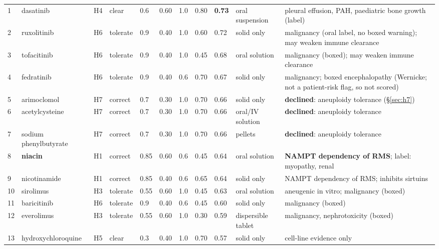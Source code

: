 \documentclass[10pt]{article}
\begin{document}
\begin{table}[H]\sffamily\scriptsize
\begin{tabularx}{\linewidth}{@{}P{0.45cm}P{2.1cm}P{0.6cm}P{1.0cm}P{0.55cm}P{0.6cm}P{0.55cm}P{0.55cm}P{0.7cm}P{1.75cm}L@{}}
\toprule\thead{\#} &  &  &  &  &  &  &  &  &  & \\ & dasatinib & H4 & clear & 0.6 & 0.60 & 1.0 & 0.80 & \textbf{0.73} & oral suspension & pleural effusion, PAH, paediatric bone growth (label)\\
2 & ruxolitinib & H6 & tolerate & 0.9 & 0.40 & 1.0 & 0.60 & 0.72 & solid only & malignancy (oral label, no boxed warning); may weaken immune clearance\\
3 & tofacitinib & H6 & tolerate & 0.9 & 0.40 & 1.0 & 0.45 & 0.68 & oral solution & malignancy (boxed); may weaken immune clearance\\
4 & fedratinib & H6 & tolerate & 0.9 & 0.40 & 0.6 & 0.70 & 0.67 & solid only & malignancy; boxed encephalopathy (Wernicke; not a patient-risk flag, so not scored)\\
5 & arimoclomol & H7 & correct & 0.7 & 0.30 & 1.0 & 0.70 & 0.66 & solid only & \textbf{declined}: aneuploidy tolerance (§\ref{sec:h7})\\
6 & acetylcysteine & H7 & correct & 0.7 & 0.30 & 1.0 & 0.70 & 0.66 & oral/IV solution & \textbf{declined}: aneuploidy tolerance\\
7 & sodium phenylbutyrate & H7 & correct & 0.7 & 0.30 & 1.0 & 0.70 & 0.66 & pellets & \textbf{declined}: aneuploidy tolerance\\
8 & \textbf{niacin} & H1 & correct & 0.85 & 0.60 & 0.6 & 0.45 & 0.64 & oral solution & \textbf{NAMPT dependency of RMS}; label: myopathy, renal\\
9 & nicotinamide & H1 & correct & 0.85 & 0.40 & 0.6 & 0.65 & 0.64 & solid only & NAMPT dependency of RMS; inhibits sirtuins\\
10 & sirolimus & H3 & tolerate & 0.55 & 0.60 & 1.0 & 0.45 & 0.63 & oral solution & aneugenic in vitro; malignancy (boxed)\\
11 & baricitinib & H6 & tolerate & 0.9 & 0.40 & 0.6 & 0.45 & 0.60 & solid only & malignancy (boxed)\\
12 & everolimus & H3 & tolerate & 0.55 & 0.60 & 1.0 & 0.30 & 0.59 & dispersible tablet & malignancy, nephrotoxicity (boxed)\\
13 & hydroxychloroquine & H5 & clear & 0.3 & 0.40 & 1.0 & 0.70 & 0.57 & solid only & cell-line evidence only\\

\end{tabularx}
\end{table}
\end{document}
